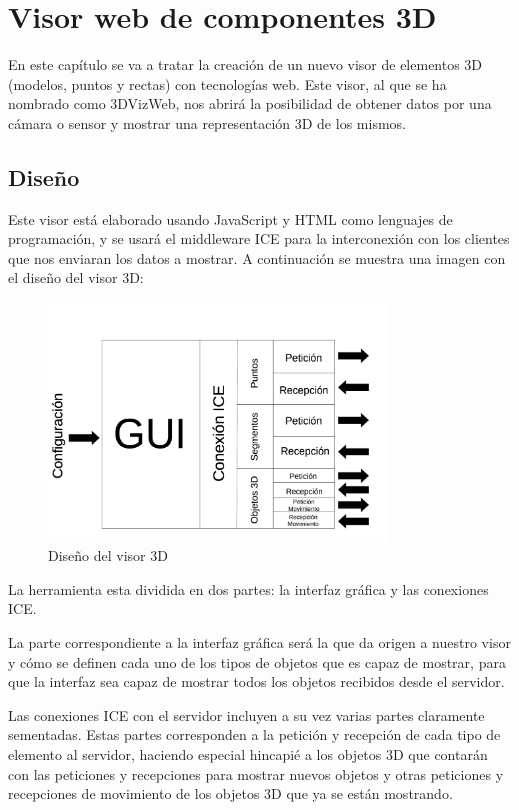 \chapter{Visor web de componentes 3D}\label{cap.visor3d}
En este capítulo se va a tratar la creación de un nuevo visor de elementos 3D (modelos, puntos y rectas) con tecnologías web. Este visor, al que se ha nombrado como 3DVizWeb, nos abrirá la posibilidad de obtener datos por una cámara o sensor y mostrar una representación 3D de los mismos.
\section{Diseño}
Este visor está elaborado usando JavaScript y HTML como lenguajes de programación, y se usará el middleware ICE para la interconexión con los clientes que nos enviaran los datos a mostrar. A continuación se muestra una imagen con el diseño del visor 3D:

\begin{figure}[H]
  \begin{center}
    \includegraphics[width=0.8\textwidth]{figures/diseno3dviz.png}
		\caption{Diseño del visor 3D}
		\label{fig.diseno3dviz}
		\end{center}
\end{figure}
La herramienta esta dividida en dos partes: la interfaz gráfica y las conexiones ICE.

La parte correspondiente a la interfaz gráfica será la que da origen a nuestro visor y cómo se definen cada uno de los tipos de objetos que es capaz de mostrar, para que la interfaz sea capaz de mostrar todos los objetos recibidos desde el servidor.

Las conexiones ICE con el servidor incluyen a su vez varias partes claramente sementadas. Estas partes corresponden a la petición y recepción de cada tipo de elemento al servidor, haciendo especial hincapié a los objetos 3D que contarán con las peticiones y recepciones para mostrar nuevos objetos y otras peticiones y recepciones de movimiento de los objetos 3D que ya se están mostrando.
